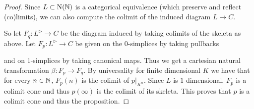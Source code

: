 \begin{lemma}
\begin{proof}
        Since $L\subset\operatorname{N}(\mathbb{N})$ is a categorical equivalence (which preserve and reflect (co)limits), we can also compute the colimit of the induced diagram $L\to C$. %

        So let $F_q\colon L^{\rhd}\to C$ be the diagram induced by taking colimits of the skeleta as above.
        Let $F_p\colon L^{\rhd}\to C$ be given on the $0$-simplices by taking pullbacks
        \begin{center}
        \end{center}
        and on $1$-simplices by taking canonical maps.
        Thus we get a cartesian natural transformation $\beta\colon F_p\to F_q$.
        By universality for finite dimensional $K$ we have that for every $n\in\mathbb{N}$, $F_p(n)$ is the colimit of $p|_{K^n}$.
        Since $L$ is $1$-dimensional, $F_p$ is a colimit cone and thus $p(\infty)$ is the colimit of its skeleta.
        This proves that $p$ is a colimit cone and thus the proposition.
    \end{proof}
\end{lemma}
